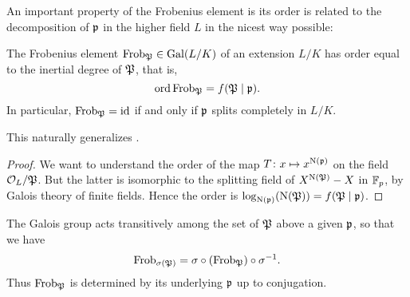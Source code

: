 An important property of the Frobenius element is its order
is related to the decomposition of $\mathfrak p$ in the higher field $L$
in the nicest way possible:
\begin{lemma}
	The Frobenius element $\mathrm{Frob}_\mathfrak P \in \operatorname{Gal}(L/K)$
	of an extension $L/K$ has order equal to the
	inertial degree of $\mathfrak P$, that is,
	\[ \operatorname{ord} \mathrm{Frob}_\mathfrak P = f(\mathfrak P \mid \mathfrak p). \]
	In particular, $\mathrm{Frob}_\mathfrak P = \mathrm{id}$ if and only if $\mathfrak p$
	splits completely in $L/K$.
\end{lemma}
This naturally generalizes .
\begin{proof}
	We want to understand the order of the map $T \colon x \mapsto x^{\operatorname{N}(\mathfrak p)}$ on
	the field $\mathcal O_L / \mathfrak P$.
	But the latter is isomorphic to the splitting field
	of $X^{\operatorname{N}(\mathfrak P)} - X$ in $\mathbb F_p$, by Galois theory of finite fields.
	Hence the order is $\log_{\operatorname{N}(\mathfrak p)} (\operatorname{N}(\mathfrak P)) = f(\mathfrak P \mid \mathfrak p)$.
\end{proof}

The Galois group acts transitively among the set of $\mathfrak P$ above a given $\mathfrak p$,
so that we have
\[ \mathrm{Frob}_{\sigma(\mathfrak P)} = \sigma \circ (\mathrm{Frob}_{\mathfrak P}) \circ \sigma^{-1}.  \]
Thus $\mathrm{Frob}_\mathfrak P$ is determined by its underlying $\mathfrak p$ up to conjugation.

